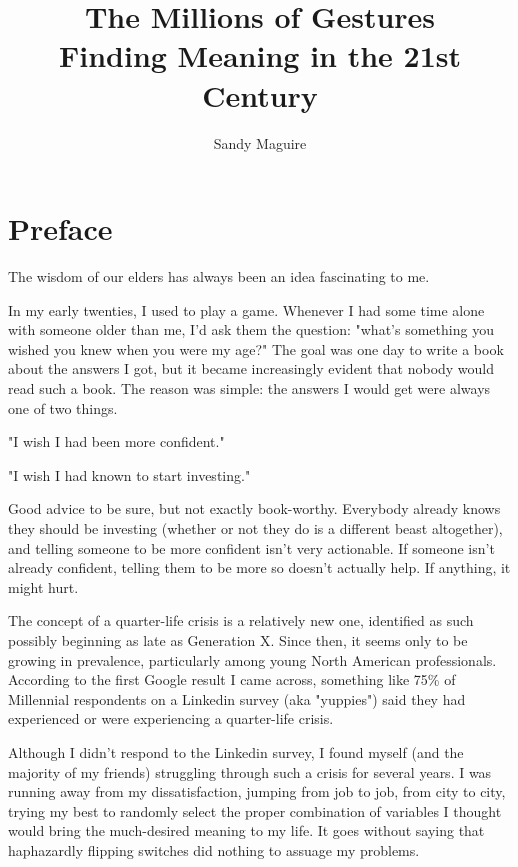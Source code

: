 \documentclass[]{book}
\title{\textbf{\LARGE The Millions of Gestures}\\
       {\Large{Finding Meaning in the 21st Century}}}
\author{Sandy Maguire}
\date{}
\begin{document}
\frontmatter
\maketitle

\tableofcontents

\linenumbers

\chapter*{Preface}

The wisdom of our elders has always been an idea fascinating to me.

In my early twenties, I used to play a game. Whenever I had some time alone with
someone older than me, I'd ask them the question: "what's something you wished
you knew when you were my age?" The goal was one day to write a book about the
answers I got, but it became increasingly evident that nobody would read such a
book. The reason was simple: the answers I would get were always one of two
things.

"I wish I had been more confident."

"I wish I had known to start investing."

Good advice to be sure, but not exactly book-worthy. Everybody already knows
they should be investing (whether or not they do is a different beast
altogether), and telling someone to be more confident isn't very actionable. If
someone isn't already confident, telling them to be more so doesn't actually
help. If anything, it might hurt.

The concept of a quarter-life crisis is a relatively new one, identified as such
possibly beginning as late as Generation X. Since then, it seems only to be
growing in prevalence, particularly among young North American professionals.
According to the first Google result I came across, something like 75\% of
Millennial respondents on a Linkedin survey (aka "yuppies") said they had
experienced or were experiencing a quarter-life crisis.

Although I didn't respond to the Linkedin survey, I found myself (and the
majority of my friends) struggling through such a crisis for several years. I
was running away from my dissatisfaction, jumping from job to job, from city to
city, trying my best to randomly select the proper combination of variables I
thought would bring the much-desired meaning to my life. It goes without saying
that haphazardly flipping switches did nothing to assuage my problems.
\end{document}
